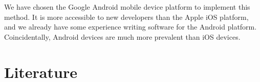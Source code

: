 \documentclass{article}
\begin{document}
We have chosen the Google Android mobile device platform to implement this method.
It is more accessible to new developers than the Apple iOS platform, and we already have some experience writing software for the Android platform.
Coincidentally, Android devices are much more prevalent than iOS devices.

\section{Literature}



\end{document}
